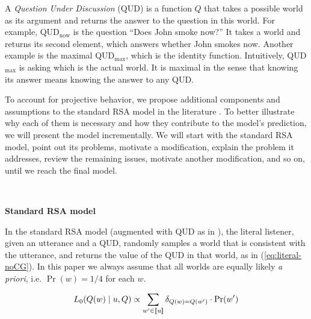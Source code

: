A \emph{Question Under Discussion} (QUD) is a function $Q$ that takes a possible world as 
 its argument and returns the answer to the question in this world.
For example, QUD$_\textrm{now}$ is the question ``Does John smoke now?'' 
It takes a world and returns its second element, which answers whether 
 John smokes now. 
Another example is the maximal QUD$_\textrm{max}$, which is the identity function. 
Intuitively, QUD$_\textrm{max}$ is asking which is the actual world.
It is maximal in the sense that knowing its answer means knowing the answer to 
 any QUD.
 
To account for projective behavior, we propose 
 additional components and assumptions to the standard RSA model in the literature
 \cite{FrankGoodman2012:Predicting-Pragmatic-Reasoning-,GoodmanStuhlmuller2013:Knowledge-and-I,GoodmanLassiter2015-Chapter}.
To better illustrate why each of them is necessary and how they contribute to 
 the model's prediction, we will present the model incrementally. 
We will start with the standard RSA model, point out its problems, motivate 
 a modification, explain the problem it addresses, review the remaining issues, 
 motivate another modification, and so on, until we reach the final model.

\ 

\noindent\textbf{Standard RSA model}

In the standard RSA model (augmented with QUD as in ), the literal listener, given an utterance and a QUD, 
 randomly samples a world that is consistent with the utterance, 
 and returns the value of the QUD in that world, as in (\ref{eq:literal-noCG}). 
In this paper we always assume that all worlds are equally likely \emph{a priori}, 
 i.e. $\Pr(w)=1/4$ for each $w$.

\vspace{-6pt}
\begin{equation}
L_0(Q(w) \mid u, Q) \propto  \sum_{w'\in \llbracket \text{u} \rrbracket} \delta_{Q(w)=Q(w')} \cdot \Pr(w')  \label{eq:literal-noCG}
\end{equation}

 

